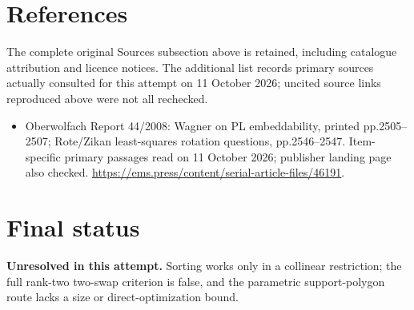 \documentclass[11pt]{article}
\begin{document}
\section{References}
The complete original Sources subsection above is retained, including catalogue attribution and licence notices. The additional list records primary sources actually consulted for this attempt on 11 October 2026; uncited source links reproduced above were not all rechecked.
\begin{itemize}
\item Oberwolfach Report 44/2008: Wagner on PL embeddability, printed pp.2505--2507; Rote/Zikan least-squares rotation questions, pp.2546--2547. Item-specific primary passages read on 11 October 2026; publisher landing page also checked. \url{https://ems.press/content/serial-article-files/46191}.
\end{itemize}
\section{Final status}
\textbf{Unresolved in this attempt.} Sorting works only in a collinear restriction; the full rank-two two-swap criterion is false, and the parametric support-polygon route lacks a size or direct-optimization bound.
\end{document}
